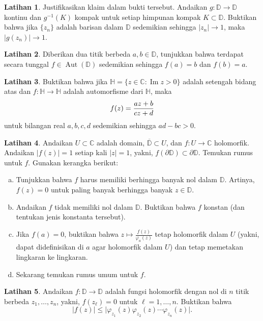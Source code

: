 \documentclass[12pt,openany]{book}
\newcommand{\avoidbreak}{\postdisplaypenalty=100}
\renewcommand{\Im}{\operatorname{Im}}
\newcommand{\Aut}{\operatorname{Aut}}
\newcommand{\sabs}[1]{\lvert {#1} \rvert}
\newcommand{\C}{{\mathbb{C}}}
\newcommand{\D}{{\mathbb{D}}}
\newcommand{\bH}{{\mathbb{H}}}
\theoremstyle{plain}
\theoremstyle{remark}
\theoremstyle{definition}
\newenvironment{exbox}{%
    \def\FrameCommand{\vrule width 1pt \relax\hspace{10pt}}%
    \MakeFramed{\advance\hsize-\width\FrameRestore}%
}{%
    \endMakeFramed
}
\newenvironment{exparts}{%
    \leavevmode\begin{enumerate}[a),noitemsep,topsep=0pt,parsep=0pt,partopsep=0pt]
}{%
    \end{enumerate}
}
\theoremstyle{exercise}
\newtheorem{exercise}{Latihan}[section]
\theoremstyle{example}
\begin{document}
\begin{exbox}
\begin{exercise}
Justifikasikan klaim dalam bukti tersebut.  Andaikan
$g \colon \D \to \D$ kontinu dan $g^{-1}(K)$ kompak
untuk setiap himpunan kompak $K \subset \D$.  Buktikan bahwa jika $\{ z_n \}$ adalah barisan
dalam $\D$ sedemikian sehingga $\sabs{z_n} \to 1$, maka
$\sabs{g(z_n)} \to 1$.
\end{exercise}

\begin{exercise}
Diberikan dua titik berbeda $a,b \in \D$, tunjukkan bahwa terdapat secara tunggal 
$f \in \Aut(\D)$
sedemikian sehingga $f(a) = b$ dan $f(b) = a$.
\end{exercise}

\begin{exercise}
Buktikan bahwa jika $\bH = \{ z \in \C : \Im z > 0 \}$ adalah setengah bidang atas
dan $f \colon \bH \to \bH$ adalah automorfisme dari $\bH$, maka
\begin{equation*}
f(z) = \frac{a z +b}{c z + d}
\avoidbreak
\end{equation*}
untuk bilangan real $a,b,c,d$ sedemikian sehingga $ad-bc > 0$.
\end{exercise}

\begin{exercise}
Andaikan $U \subset \C$ adalah domain, $\overline{\D} \subset U$,
dan $f \colon U \to \C$ holomorfik.
Andaikan $\sabs{f(z)}=1$ setiap kali $\sabs{z}=1$,
yakni, $f(\partial \D) \subset \partial \D$.
Temukan rumus untuk $f$.  Gunakan kerangka berikut:
\begin{exparts}
\item
Tunjukkan bahwa $f$ harus memiliki berhingga banyak nol dalam $\D$.  Artinya, $f(z) = 0$
untuk paling banyak berhingga banyak $z \in \D$.
\item
Andaikan $f$ tidak memiliki nol dalam $\D$.  Buktikan bahwa $f$ konstan
(dan tentukan jenis konstanta tersebut).
\item
Jika $f(a) = 0$, buktikan bahwa
$z \mapsto \frac{f(z)}{\varphi_a(z)}$ tetap holomorfik dalam $U$
(yakni, dapat didefinisikan di $a$ agar holomorfik dalam $U$)
dan tetap memetakan lingkaran ke lingkaran.
\item
Sekarang temukan rumus umum untuk $f$.
\end{exparts}
\end{exercise}

\begin{exercise}
Andaikan $f \colon \D \to \D$ adalah fungsi holomorfik dengan nol di
$n$ titik berbeda
$z_1,\ldots,z_n$, yakni, $f(z_\ell) = 0$ untuk $\ell=1,\ldots,n$.  Buktikan bahwa
\begin{equation*}
\sabs{f(z)} \leq \sabs{\varphi_{z_1}(z)  
\varphi_{z_2}(z)
\cdots
\varphi_{z_n}(z)} .
\end{equation*}
\end{exercise}


\end{exbox}
\end{document}
